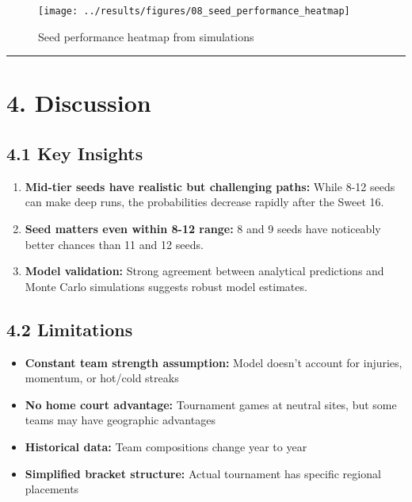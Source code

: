 \documentclass[
]{article}
\providecommand{\tightlist}{%
  \setlength{\itemsep}{0pt}\setlength{\parskip}{0pt}}
\begin{document}
\begin{figure}

{\centering \texttt{[image: ../results/figures/08\_seed\_performance\_heatmap]} 

}

\caption{Seed performance heatmap from simulations}\label{fig:heatmap}
\end{figure}

\begin{center}\rule{0.5\linewidth}{0.5pt}\end{center}

\section{4. Discussion}\label{discussion}

\subsection{4.1 Key Insights}\label{key-insights}

\begin{enumerate}
\def\labelenumi{\arabic{enumi}.}
\item
  \textbf{Mid-tier seeds have realistic but challenging paths:} While
  8-12 seeds can make deep runs, the probabilities decrease rapidly
  after the Sweet 16.
\item
  \textbf{Seed matters even within 8-12 range:} 8 and 9 seeds have
  noticeably better chances than 11 and 12 seeds.
\item
  \textbf{Model validation:} Strong agreement between analytical
  predictions and Monte Carlo simulations suggests robust model
  estimates.
\end{enumerate}

\subsection{4.2 Limitations}\label{limitations}

\begin{itemize}
\tightlist
\item
  \textbf{Constant team strength assumption:} Model doesn't account for
  injuries, momentum, or hot/cold streaks
\item
  \textbf{No home court advantage:} Tournament games at neutral sites,
  but some teams may have geographic advantages
\item
  \textbf{Historical data:} Team compositions change year to year
\item
  \textbf{Simplified bracket structure:} Actual tournament has specific
  regional placements
\end{itemize}
\end{document}
